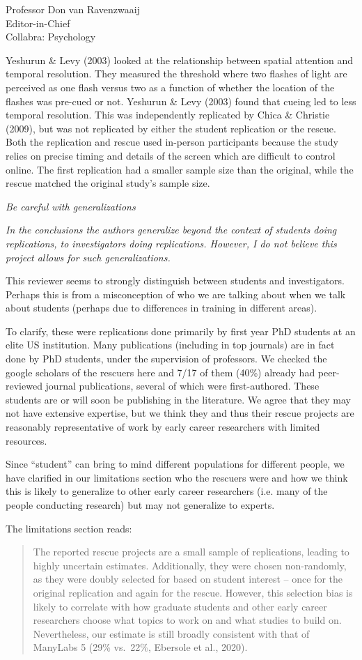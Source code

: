\documentclass{stanfordletter}
\newcommand{\theysaid}[1]{\begin{leftbar} \noindent 
		\textsl{ #1}\end{leftbar}}
\newcommand{\revised}[1]{\begin{quote}	#1 \end{quote}}
\begin{document}
\begin{letter}{Professor Don van Ravenzwaaij \\ Editor-in-Chief \\ Collabra: Psychology }
{		 	Yeshurun \& Levy (2003) looked at the relationship between spatial attention and temporal resolution.
		 	They measured the threshold where two flashes of light are perceived as one flash versus two as a function of whether the location of the flashes was pre-cued or not.
		 	Yeshurun \& Levy (2003) found that cueing led to less temporal resolution.
		 	This was independently replicated by Chica \& Christie (2009), but was not replicated by either the student replication or the rescue.
		 	Both the replication and rescue used in-person participants because the study relies on precise timing and details of the screen which are difficult to control online.
		 	The first replication had a smaller sample size than the original, while the rescue matched the original study's sample size.
		 	
		 	
		 }
		
		\theysaid{Be careful with generalizations}
		\theysaid{In the conclusions the authors generalize beyond the context of students doing replications, to investigators doing replications. However, I do not believe this project allows for such generalizations.} 
		
		This reviewer seems to strongly distinguish between students and investigators. Perhaps this is from a misconception of who we are talking about when we talk about students (perhaps due to differences in training in different areas). 
		
		To clarify, these were replications done primarily by first year PhD students at an elite US institution. Many publications (including in top journals) are in fact done by PhD students, under the supervision of professors. We checked the google scholars of the rescuers here and 7/17 of them (40\%) already had peer-reviewed journal publications, several of which were first-authored. These students are or will soon be publishing in the literature. We agree that they may not have extensive expertise, but we think they and thus their rescue projects are reasonably representative of work by early career researchers with limited resources.
		
		Since ``student'' can bring to mind different populations for different people, we have clarified in our limitations section who the rescuers were and how we think this is likely to generalize to other early career researchers (i.e. many of the people conducting research) but may not generalize to experts. 
		
		The limitations section reads:
		
		\revised{
			The reported rescue projects are a small sample of replications, leading to highly uncertain estimates.
			Additionally, they were chosen non-randomly, as they were doubly selected for based on student interest -- once for the original replication and again for the rescue.
			However, this selection bias is likely to correlate with how graduate students and other early career researchers choose what topics to work on and what studies to build on.
			Nevertheless, our estimate is still broadly consistent with that of ManyLabs 5 (29\% vs.~22\%, Ebersole et al., 2020).
			\newline
			
}
\end{letter}
\end{document}

